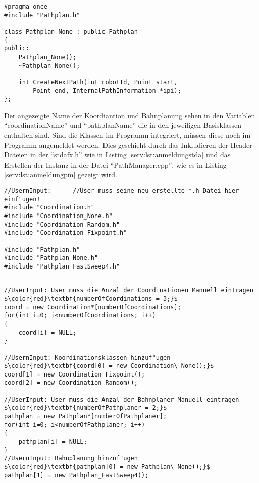 \begin{lstlisting}[frame=tb,captionpos=b,caption=Bahnplantemplate., label=serv:lst:bahnplantemp]
#pragma once
#include "Pathplan.h"

class Pathplan_None : public Pathplan
{
public:
    Pathplan_None();
    ~Pathplan_None();

    int CreateNextPath(int robotId, Point start,
		Point end, InternalPathInformation *ipi);
};
\end{lstlisting}

Der angezeigte Name der Koordiantion und Bahnplanung sehen in den Variablen "`coordinationName"' und "`pathplanName"' die in den jeweiligen Basisklassen enthalten sind. Sind die Klassen im Programm integriert, müssen diese noch im Programm angemeldet werden. Dies geschieht durch das Inkludieren der Header-Dateien in der "`stdafx.h"' wie in Listing \ref{serv:lst:anmeldungstda} und das Erstellen der Instanz in der Datei "`PathManager.cpp"', wie es in Listing \ref{serv:lst:anmeldungpm} gezeigt wird.

\begin{lstlisting}[frame=tb,captionpos=b,caption=Anmeldung der Klassen in stdafx.h., label=serv:lst:anmeldungstda]
//UsernInput:------//User muss seine neu erstellte *.h Datei hier einf"ugen!                                    
#include "Coordination.h"
#include "Coordination_None.h"
#include "Coordination_Random.h"
#include "Coordination_Fixpoint.h"

#include "Pathplan.h"
#include "Pathplan_None.h"
#include "Pathplan_FastSweep4.h"
\end{lstlisting}

\begin{lstlisting}[frame=tb,mathescape=true,captionpos=b,caption=Anmeldung der Klassen in PathManager.cpp., label=serv:lst:anmeldungpm]

//UserInput: User muss die Anzal der Coordinationen Manuell eintragen                                          
$\color{red}\textbf{numberOfCoordinations = 3;}$
coord = new Coordination*[numberOfCoordinations];
for(int i=0; i<numberOfCoordinations; i++)
{
    coord[i] = NULL;
}

//UsernInput: Koordinationsklassen hinzuf"ugen                
$\color{red}\textbf{coord[0] = new Coordination\_None();}$
coord[1] = new Coordination_Fixpoint();
coord[2] = new Coordination_Random();  

//UserInput: User muss die Anzal der Bahnplaner Manuell eintragen                                          
$\color{red}\textbf{numberOfPathplaner = 2;}$
pathplan = new Pathplan*[numberOfPathplaner];
for(int i=0; i<numberOfPathplaner; i++)
{
    pathplan[i] = NULL;
}
//UsernInput: Bahnplanung hinzuf"ugen
$\color{red}\textbf{pathplan[0] = new Pathplan\_None();}$
pathplan[1] = new Pathplan_FastSweep4();

\end{lstlisting}
